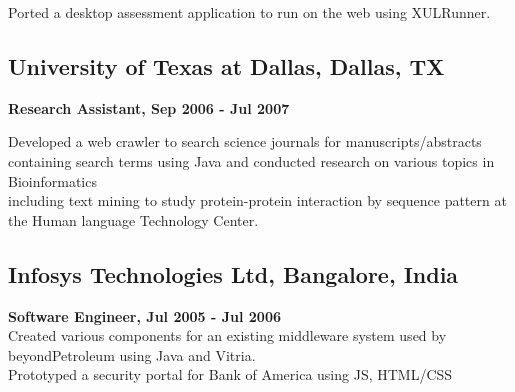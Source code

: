 \documentclass{article}
\begin{document}
\begin{minipage}[t]{3.8in}
      Ported a desktop assessment application to run on the web using XULRunner. 
      
      \subsection*{University of Texas at Dallas, Dallas, TX }
      
      {\bf Research Assistant, Sep 2006 - Jul 2007}
  
      Developed a web crawler to search science journals for manuscripts/abstracts containing search terms using Java and conducted research on various topics in Bioinformatics \\ including text mining to study protein-protein interaction by sequence pattern at the Human language Technology Center. 
      
      \subsection*{Infosys Technologies Ltd, Bangalore, India }
      
      {\bf Software Engineer, Jul 2005 - Jul 2006} \\
      Created various components for an existing middleware system used by beyondPetroleum using Java and Vitria. \\
      Prototyped a security portal for Bank of America using JS, HTML/CSS
\end{minipage}
\hfill
\end{document}
